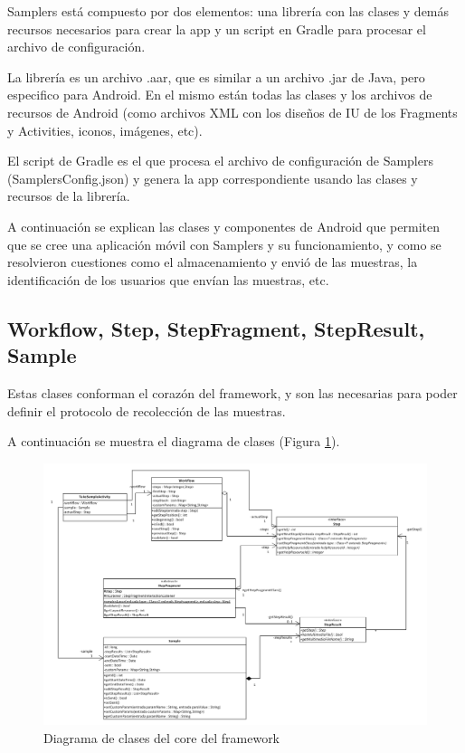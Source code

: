 Samplers está compuesto por dos elementos: una librería con las clases y demás recursos necesarios para crear la app y un script en Gradle para procesar el archivo de configuración.

La librería es un archivo .aar, que es similar a un archivo .jar de Java, pero especifico para Android. En el mismo están todas las clases y los archivos de recursos de Android (como archivos XML con los diseños de IU de los Fragments y Activities, iconos, imágenes, etc).

El script de Gradle es el que procesa el archivo de configuración de Samplers (SamplersConfig.json) y genera la app correspondiente usando las clases y recursos de la librería.

A continuación se explican las clases y componentes de Android que permiten que se cree una aplicación móvil con Samplers y su funcionamiento, y como se resolvieron cuestiones como el almacenamiento y envió de las muestras, la identificación de los usuarios que envían las muestras, etc.

\subsection{Workflow, Step, StepFragment, StepResult, Sample}
Estas clases conforman el corazón del framework, y son las necesarias para poder definir el protocolo de recolección de las muestras.

A continuación se muestra el diagrama de clases (Figura \ref{fig:umlFrameworkCore}).

\begin{figure}[H]
  \centering
    \includegraphics[scale=0.4]{05-implementacion/FrameworkCore.png} 
   \caption{Diagrama de clases del core del framework}
   \label{fig:umlFrameworkCore}
\end{figure}


